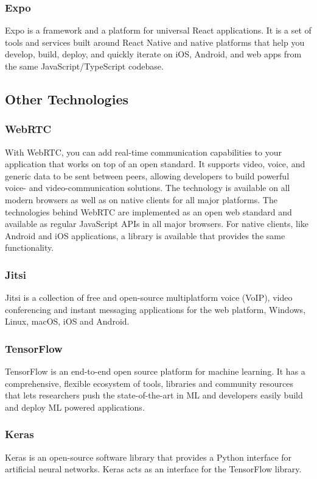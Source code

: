     \subsubsection{Expo}
    Expo is a framework and a platform for universal React applications. 
    It is a set of tools and services built around React Native and native platforms that help you develop, build, 
    deploy, and quickly iterate on iOS, Android, and web apps from the same JavaScript/TypeScript codebase.

\subsection{Other Technologies}

    \subsubsection{WebRTC}
    With WebRTC, you can add real-time communication capabilities to your application that works on top of an open standard. 
    It supports video, voice, and generic data to be sent between peers, allowing developers to build powerful 
    voice- and video-communication solutions. The technology is available on all modern browsers as well as on native clients 
    for all major platforms. The technologies behind WebRTC are implemented as an open web standard and available as regular JavaScript APIs 
    in all major browsers. For native clients, like Android and iOS applications, a library is available that provides the same functionality.

    \subsubsection{Jitsi}

    Jitsi is a collection of free and open-source multiplatform voice (VoIP), video conferencing and instant messaging applications for the web platform, 
    Windows, Linux, macOS, iOS and Android.

    \subsubsection{TensorFlow}
    TensorFlow is an end-to-end open source platform for machine learning. It has a comprehensive, flexible ecosystem of tools, 
    libraries and community resources that lets researchers push the state-of-the-art in ML and developers easily build and deploy ML powered applications.

    \subsubsection{Keras}
    Keras is an open-source software library that provides a Python interface for artificial neural networks. Keras acts as an interface for the TensorFlow library. 